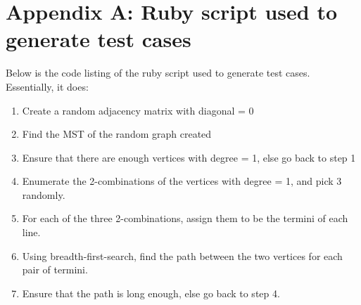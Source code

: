 \documentclass[a4paper,12pt]{article}
\begin{document}
\newpage
\section{Appendix A: Ruby script used to generate test cases}
Below is the code listing of the ruby script used to generate test cases. Essentially, it does:
\begin{enumerate}
	\item Create a random adjacency matrix with diagonal = 0
	\item Find the MST of the random graph created
	\item Ensure that there are enough vertices with degree = 1, else go back to step 1
	\item Enumerate the 2-combinations of the vertices with degree = 1, and pick 3 randomly.
	\item For each of the three 2-combinations, assign them to be the termini of each line.
	\item Using breadth-first-search, find the path between the two vertices for each pair of termini.
	\item Ensure that the path is long enough, else go back to step 4.
\end{enumerate}
\end{document}
